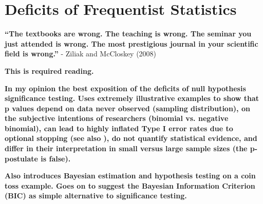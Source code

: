 \documentclass[12pt]{scrartcl}
\begin{document}
\section{Deficits of Frequentist Statistics}

\begin{displayquote}
\textbf{``The textbooks are wrong. The teaching is wrong. The seminar you just attended is wrong. The most prestigious journal in your scientific field is wrong.''} - Ziliak and McCloskey (2008)
\end{displayquote}

\begin{description}
  \item {}
  \item {}
  \item {}
  \item {}
  \item {}
  \item {}
  \item {}
  \item {}
  \item {}
  \item {}
  \item {}
  \textbf{This is required reading.}
  \item {}
  \item {}
  
  \textbf{In my opinion the best exposition of the deficits of null hypothesis significance testing. Uses extremely illustrative examples to show that p values depend on data never observed (sampling distribution), on the subjective intentions of researchers (binomial vs. negative binomial), can lead to highly inflated Type I error rates due to optional stopping (see also \cite{simmons2011false}), do not quantify statistical evidence, and differ in their interpretation in small versus large sample sizes (the p-postulate is false).}
  
  \textbf{Also introduces Bayesian estimation and hypothesis testing on a coin toss example. Goes on to suggest the Bayesian Information Criterion (BIC) as simple alternative to significance testing.}
  
  \item {}
  

\end{description}
\end{document}
